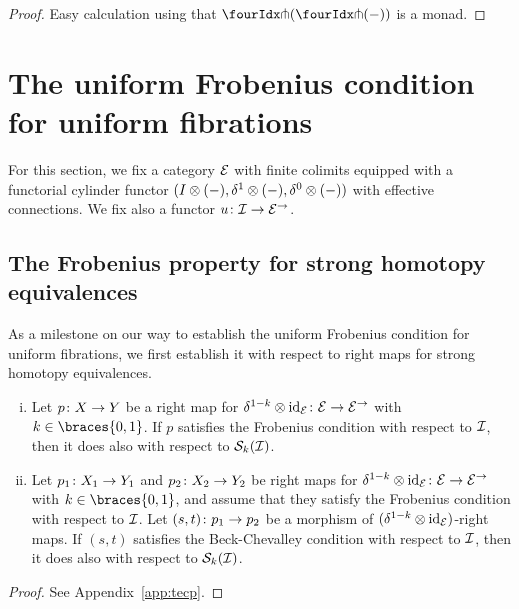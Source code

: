 \documentclass[reqno,10pt,a4paper,oneside,draft]{amsart}
\begin{document}
\begin{proof}
Easy calculation using that $\liftl{(\liftr{(-)})}$ is a monad.
\end{proof}


\section{The uniform Frobenius condition for uniform fibrations}
\label{sec:frocuf}

For this section, we fix a category $\catE$ with finite colimits equipped with a functorial cylinder functor $(\interval \otimes (-), \rcyl \otimes (-), \lcyl \otimes (-))$ with effective connections.
We fix also a functor $u \co \cal{I} \to \catE^\to$.

\subsection*{The Frobenius property for  strong homotopy equivalences}

As a milestone on our way to establish the uniform Frobenius condition for uniform fibrations, we first establish it with respect to right maps for strong homotopy equivalences.




\begin{lemma} \hfill
 \label{strong-h-equiv-frobenius-BC}
\begin{enumerate}[(i)] 
\item Let $p \co X \to Y$ be a right map for $\kcylinv \otimes \id_{\calE} \co \catE \to \catE^\to$ with $k \in \braces{0, 1}$.
If $p$ satisfies the Frobenius condition with respect to $\cal{I}$, then it does also with respect to $\cal{S}_k(\cal{I})$.
\item Let $p_1 \co X_1 \to Y_1$ and $p_2 \co X_2 \to Y_2$ be right maps for $\kcylinv \otimes \id_{\calE} \co \catE \to \catE^\to$ with $k \in \braces{0, 1}$, and assume that they satisfy the Frobenius condition with respect to $\cal{I}$.
Let $(s, t) \co p_1 \to p_2$ be a morphism of $(\kcylinv \otimes \id_\catE)$-right maps.
If $(s, t)$ satisfies the Beck-Chevalley condition with respect to $\cal{I}$, then it does also with respect to $\cal{S}_k(\cal{I})$.
\end{enumerate}
\end{lemma}

\begin{proof}
See Appendix~\ref{app:tecp}.
\end{proof}
\end{document}
